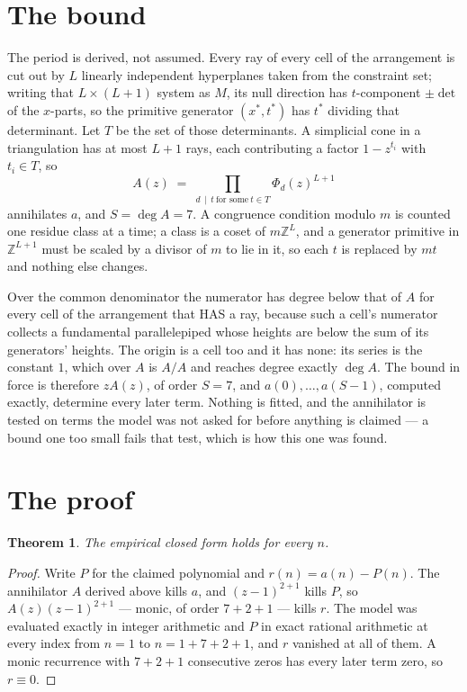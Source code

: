 \documentclass[11pt,a4paper]{article}
\theoremstyle{plain}
\newtheorem{theorem}{Theorem}
\theoremstyle{definition}
\begin{document}
\section{The bound}

The period is derived, not assumed. Every ray of every cell of the arrangement is cut out by
$L$ linearly independent hyperplanes taken from the constraint set; writing that $L\times(L+1)$
system as $M$, its null direction has $t$-component $\pm\det$ of the $x$-parts, so the
primitive generator $(x^*,t^*)$ has $t^*$ dividing that determinant. Let $T$ be the set of
those determinants. A simplicial cone in a triangulation has at most $L+1$ rays, each
contributing a factor $1-z^{t_i}$ with $t_i\in T$, so
\[
A(z)\;=\;\prod_{d\,\mid\,t\ \text{for some}\ t\in T}\Phi_d(z)^{L+1}
\]
annihilates $a$, and $S=\deg A=7$. A congruence condition modulo $m$ is counted one residue
class at a time; a class is a coset of $m\mathbb{Z}^L$, and a generator primitive in
$\mathbb{Z}^{L+1}$ must be scaled by a divisor of $m$ to lie in it, so each $t$ is replaced
by $mt$ and nothing else changes.

Over the common denominator the numerator has degree below that of $A$ for every cell of the
arrangement that HAS a ray, because such a cell's numerator collects a fundamental
parallelepiped whose heights are below the sum of its generators' heights. The origin is a cell
too and it has none: its series is the constant $1$, which over $A$ is $A/A$ and reaches degree
exactly $\deg A$. The bound in force is therefore $zA(z)$, of order $S=7$, and
$a(0),\dots,a(S-1)$, computed exactly, determine every later term. Nothing is fitted, and the
annihilator is tested on terms the model was not asked for before anything is claimed --- a
bound one too small fails that test, which is how this one was found.

\section{The proof}

\begin{theorem}
The empirical closed form holds for every $n$.
\end{theorem}

\begin{proof}
Write $P$ for the claimed polynomial and $r(n)=a(n)-P(n)$. The annihilator $A$ derived above
kills $a$, and $(z-1)^{2+1}$ kills $P$, so $A(z)(z-1)^{2+1}$ --- monic, of order
$7+2+1$ --- kills $r$. The model was evaluated exactly in integer arithmetic and $P$ in
exact rational arithmetic at every index from $n=1$ to $n=1+7+2+1$, and $r$ vanished
at all of them. A monic recurrence with $7+2+1$ consecutive zeros has every later term zero,
so $r\equiv0$.
\end{proof}
\end{document}
